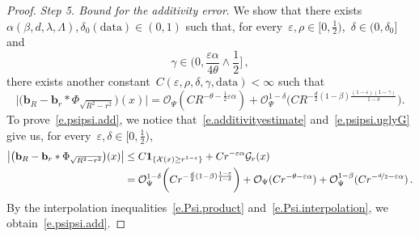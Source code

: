\documentclass[11pt,twoside]{article} %
\numberwithin{equation}{section}
\theoremstyle{definition}
\newcommand{\eps}{\varepsilon}
\renewcommand{\b}{\ensuremath{\mathbf{b}}}
\newcommand{\ep}{\eps}
\newcommand{\X}{\mathcal{X}}
\renewcommand{\O}{\mathcal{O}}
\newcommand{\indc}{\boldsymbol{1}}
\newcommand{\data}{\mathrm{data}}
\begin{document}
\begin{proof}
\emph{Step 5. Bound for the additivity error}. We show that there exists~$\alpha(\beta,d,\lambda,\Lambda),\delta_0(\data) \in (0,1)$ such that, for every~$\ep,\rho \in [0,\frac12)$,~$\delta \in (0,\delta_0]$ and
\begin{equation} \label{e.psipsi.gamma3}
\gamma 
\in 
\biggl( 0,  \frac{\ep \alpha}{4\theta} \wedge \frac12 \biggl]\,, 
\end{equation}
there exists another constant~$C(\ep,\rho,\delta,\gamma,\data) < \infty$ such that
\begin{equation} \label{e.psipsi.add}
\big|
\bigl( \b_R - \b_r \ast \Phi_{\sqrt{R^2-r^2}} \bigr) (x) 
\big|
 = 
\O_\Psi(C R^{-\theta - \frac12 \ep \alpha} )  + \O_{\Psi}^{1-\delta}\biggl(C R^{- \frac{d}{2}(1-\beta)   \frac{(1-\ep)(1 - \gamma)}{1-\delta}}  \biggr) 
.
\end{equation}
To prove~\eqref{e.psipsi.add}, we notice that~\eqref{e.additivityestimate} and~\eqref{e.psipsi.uglyG} give us, for every~$\ep, \delta \in [0,\frac12)$, 
\begin{align*}  
\big|
\bigl( \b_R - \b_r \ast \Phi_{\sqrt{R^2-r^2}} \bigr) (x) 
\big|
& 
\leq
C \indc_{\{ \X(x) \geq r^{1-\ep} \} } +  C r^{-\ep \alpha }\mathcal{G}_r(x)  
\\ 
&
= 
\O_{\Psi}^{1-\delta}\biggl(C r^{- \frac{d}{2}(1-\beta)  \frac{1-\ep}{1-\delta}} \biggr) 
+ 
\O_\Psi(C r^{-\theta - \ep \alpha} ) 
+ 
\O_\Psi^{1-\beta}(C r^{-\nicefrac d2 - \ep \alpha} ) 
\,.
\end{align*}
By the interpolation inequalities~\eqref{e.Psi.product} and~\eqref{e.Psi.interpolation},  we obtain~\eqref{e.psipsi.add}. 


\smallskip 



\end{proof}
\end{document}
